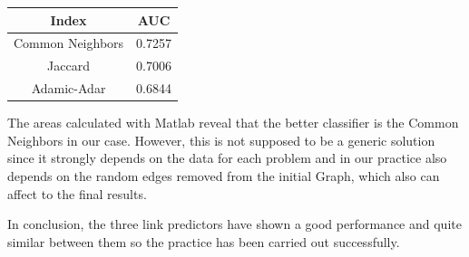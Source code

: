 \documentclass[12pt]{article}
\begin{document}
\begin{center}
\begin{tabular}{ | c | c | }
\hline
  Index & AUC \\ 
\hline
\hline
 Common Neighbors & 0.7257 \\  
 \hline
 Jaccard & 0.7006 \\  
 \hline
 Adamic-Adar & 0.6844  \\
\hline
\end{tabular}
\end{center}

The areas calculated with Matlab reveal that the better classifier is the Common Neighbors in our case. However, this is not supposed to be a generic solution since it strongly depends on the data for each problem and in our practice also depends on the random edges removed from the initial Graph, which also can affect to the final results.

In conclusion, the three link predictors have shown a good performance and quite similar between them so the practice has been carried out successfully.
\end{document}
